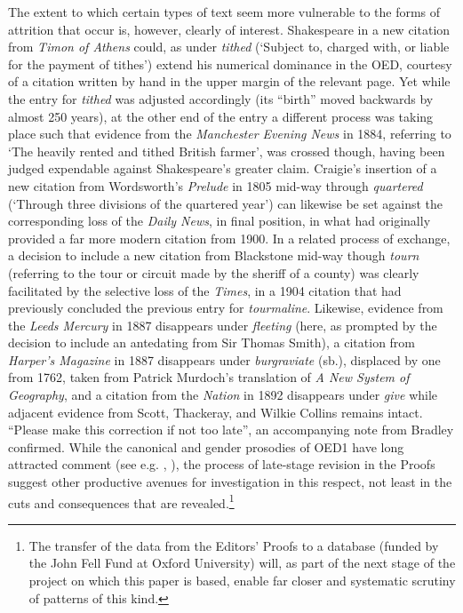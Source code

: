 \documentclass[output=paper,colorlinks,citecolor=brown,arabicfont,chinesefont]{langscibook}
\begin{document}
The extent to which certain types of text seem more vulnerable to the forms of attrition that occur is, however, clearly of interest. Shakespeare in a new citation from \emph{Timon of Athens} could, as under \emph{tithed} (‘Subject to, charged with, or liable for the payment of tithes’) extend his numerical dominance in the OED, courtesy of a citation written by hand in the upper margin of the relevant page. Yet while the entry for \emph{tithed} was adjusted accordingly (its “birth” moved backwards by almost 250 years), at the other end of the entry a different process was taking place such that evidence from the \emph{Manchester Evening News} in 1884, referring to ‘The heavily rented and tithed British farmer’, was crossed though, having been judged expendable against Shakespeare’s greater claim. Craigie’s insertion of a new citation from Wordsworth’s \textit{Prelude} in 1805 mid-way through \emph{quartered} (‘Through three divisions of the quartered year’) can likewise be set against the corresponding loss of the \emph{Daily News}, in final position, in what had originally provided a far more modern citation from 1900. In a related process of exchange, a decision to include a new citation from Blackstone mid-way though \emph{tourn} (referring to the tour or circuit made by the sheriff of a county) was clearly facilitated by the selective loss of the \emph{Times}, in a 1904 citation that had previously concluded the previous entry for \emph{tourmaline}. Likewise, evidence from the \emph{Leeds Mercury} in 1887 disappears under \emph{fleeting} (here, as prompted by the decision to include an antedating from Sir Thomas Smith), a citation from \emph{Harper’s Magazine} in 1887 disappears under \emph{burgraviate} (sb.), displaced by one from 1762, taken from Patrick Murdoch’s translation of \emph{A New System of Geography}, and a citation from the \emph{Nation} in 1892 disappears under \emph{give} while adjacent evidence from Scott, Thackeray, and Wilkie Collins remains intact. “Please make this correction if not too late”, an accompanying note from Bradley confirmed. While the canonical and gender prosodies of OED1 have long attracted comment (see e.g. \citealt{Mugglestone2005}, \citealt{Brewer2012}), the process of late-stage revision in the Proofs suggest other productive avenues for investigation in this respect, not least in the cuts and consequences that are revealed.\footnote{The transfer of the data from the Editors’ Proofs to a database (funded by the John Fell Fund at Oxford University) will, as part of the next stage of the project on which this paper is based, enable far closer and systematic scrutiny of patterns of this kind.}
\end{document}
